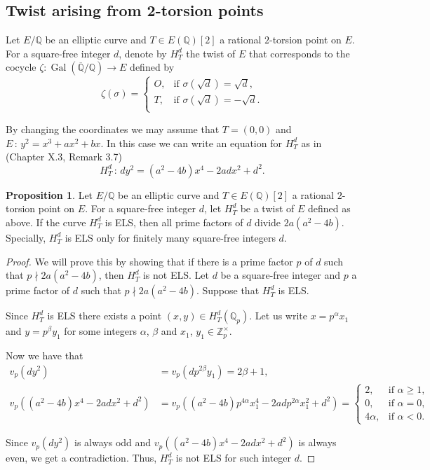 \documentclass[a4paper, 12pt]{amsart}
\theoremstyle{definition}
\newtheorem{proposition}[theorem]{Proposition}
\theoremstyle{remark}
\newcommand{\GalQ}{\operatorname{Gal}(\overline{\mathbb{Q}}/\mathbb{Q})}
\newcommand{\whichbold}[1]{\mathbb{#1}} %
\newcommand{\Z}{\whichbold{Z}}
\newcommand{\Q}{\whichbold{Q}}
\newcommand{\Qp}{\whichbold{Q}_{p}}
\numberwithin{equation}{section}
\begin{document}
\subsection{Twist arising from 2-torsion points}\label{sec:2.1}

Let $E/\Q$ be an elliptic curve and $T\in E(\Q)[2]$ a rational $2$-torsion point on $E$. For a square-free integer $d$, denote by $H^d_T$ the twist of $E$ that corresponds to the cocycle $\zeta : \GalQ \to E$ defined by 
\[
    \zeta (\sigma)=
    \begin{cases}
        O, & \text{if } \sigma(\sqrt{d})=\sqrt{d}, \\
        T, & \text{if } \sigma(\sqrt{d})=-\sqrt{d}.\\
    \end{cases}
\]

By changing the coordinates we may assume that $T=(0,0)$ and $E \,:\, y^2=x^3+ax^2+bx$.
In this case we can write an equation for $H^d_T$ as in \cite{silverman2009arithmetic} (Chapter X.3, Remark 3.7)
\[
    H^d_T \,:\, dy^2=(a^2-4b)x^4-2adx^2+d^2.
\]


\begin{proposition}\label{2-twist_els}
    Let $E/\Q$ be an elliptic curve and $T\in E(\Q)[2]$ a rational $2$-torsion point on $E$. For a square-free integer $d$, let $H^d_T$ be a twist of $E$ defined as above.
    If the curve $H^d_T$ is ELS, then all prime factors of $d$ divide $2a(a^2-4b)$.
    Specially, $H^d_T$ is ELS only for finitely many square-free integers $d$.
\end{proposition}

\begin{proof}
    We will prove this by showing that if there is a prime factor $p$ of $d$ such that ${p \nmid 2a(a^2-4b)}$, then $H^d_T$ is not ELS. 
    Let $d$ be a square-free integer and $p$ a prime factor of $d$ such that $p \nmid 2a(a^2-4b)$. Suppose that $H^d_T$ is ELS. 
    
    Since $H^d_T$ is ELS there exists a point $(x,y)\in H_T^d(\Qp)$. Let us write $x=p^\alpha x_1$ and $y=p^\beta y_1$ for some integers $\alpha$, $\beta$ and $x_1$, $y_1 \in \Z_p^\times$.

    Now we have that 
    \begin{align*}
        v_p(dy^2)&= v_p(dp^{2\beta}y_1)=2\beta+1,\\
        v_p((a^2-4b)x^4-2adx^2+d^2)&=v_p((a^2-4b)p^{4\alpha}x_1^4-2adp^{2\alpha}x_1^2+d^2)=
        \begin{cases}
            2, & \text{if } \alpha \geq 1, \\
            0, & \text{if } \alpha =0, \\
            4\alpha , & \text{if } \alpha < 0.
        \end{cases}
    \end{align*}

    Since $v_p(dy^2)$ is always odd and $v_p((a^2-4b)x^4-2adx^2+d^2)$ is always even, we get a contradiction. Thus, $H^d_T$ is not ELS for such integer $d$.
\end{proof}
\end{document}
